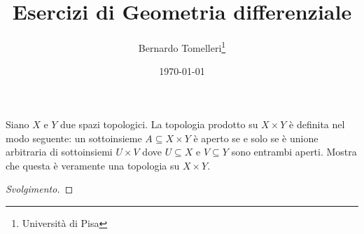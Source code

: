 \documentclass{article}[a4paper, 12pt, italian]
\title{Esercizi di Geometria differenziale}
\author{Bernardo Tomelleri\thanks{Università di Pisa}}
\date{\today}
\begin{document}
\maketitle

\begin{exercise}
Siano $X$ e $Y$ due spazi topologici. La topologia prodotto su $X \times Y$
è definita nel modo seguente: un sottoinsieme $A \subseteq X \times Y$ è
aperto se e solo se è unione arbitraria di sottoinsiemi $U \times V$ dove
$U \subseteq X$ e $V \subseteq Y$ sono entrambi aperti. Mostra che questa è
veramente una topologia su $X \times Y$.
\begin{proof}[Svolgimento]

\end{proof}
\end{exercise}
\end{document}
